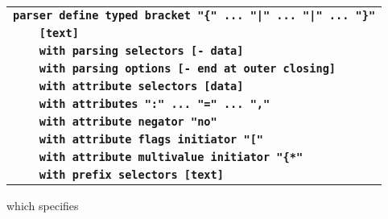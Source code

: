 \documentclass[12pt]{article}
\newcommand{\TT}[1]{{\tt \bfseries #1}}
\begin{document}
\begin{center}
\begin{tabular}{l}
\TT{parser define typed bracket "\{"~...~"|"~...~"|"~...~"\}"} \\
\TT{~~~~[text]~} \\
\TT{~~~~with parsing selectors [- data]} \\
\TT{~~~~with parsing options [- end at outer closing]} \\
\TT{~~~~with attribute selectors [data]} \\
\TT{~~~~with attributes ":"~...~"="~...~","} \\
\TT{~~~~with attribute negator "no"} \\
\TT{~~~~with attribute flags initiator "["} \\
\TT{~~~~with attribute multivalue initiator "\{*"} \\
\TT{~~~~with prefix selectors [text]} \\
\end{tabular}
\end{center}
which specifies
\end{document}
